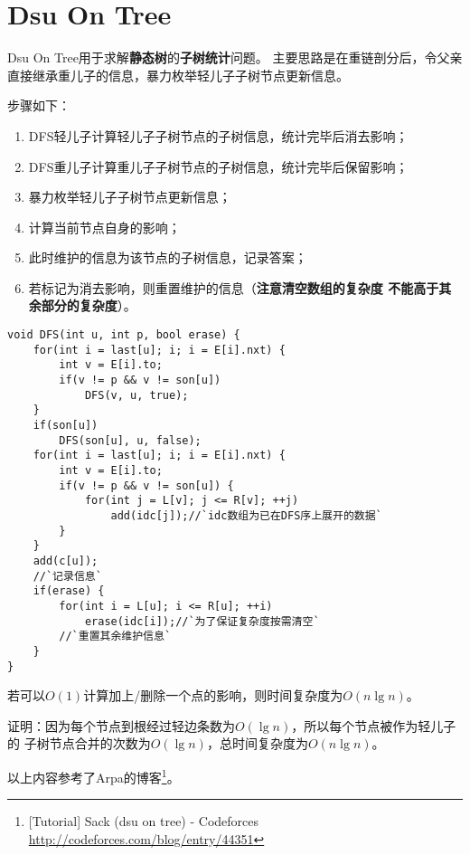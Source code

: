 \section{Dsu On Tree}
Dsu On Tree用于求解{\bfseries 静态树}的{\bfseries 子树统计}问题。
主要思路是在重链剖分后，令父亲直接继承重儿子的信息，暴力枚举轻儿子子树节点更新信息。

步骤如下：
\begin{enumerate}
    \item DFS轻儿子计算轻儿子子树节点的子树信息，统计完毕后消去影响；
    \item DFS重儿子计算重儿子子树节点的子树信息，统计完毕后保留影响；
    \item 暴力枚举轻儿子子树节点更新信息；
    \item 计算当前节点自身的影响；
    \item 此时维护的信息为该节点的子树信息，记录答案；
    \item 若标记为消去影响，则重置维护的信息（{\bfseries 注意清空数组的复杂度
    不能高于其余部分的复杂度}）。
\end{enumerate}

\begin{lstlisting}[title=Dsu On Tree]
void DFS(int u, int p, bool erase) {
    for(int i = last[u]; i; i = E[i].nxt) {
        int v = E[i].to;
        if(v != p && v != son[u])
            DFS(v, u, true);
    }
    if(son[u])
        DFS(son[u], u, false);
    for(int i = last[u]; i; i = E[i].nxt) {
        int v = E[i].to;
        if(v != p && v != son[u]) {
            for(int j = L[v]; j <= R[v]; ++j)
                add(idc[j]);//`idc数组为已在DFS序上展开的数据`
        }
    }
    add(c[u]);
    //`记录信息`
    if(erase) {
        for(int i = L[u]; i <= R[u]; ++i)
            erase(idc[i]);//`为了保证复杂度按需清空`
        //`重置其余维护信息`
    }
}
\end{lstlisting}

若可以$O(1)$计算加上/删除一个点的影响，则时间复杂度为$O(n\lg n)$。

证明：因为每个节点到根经过轻边条数为$O(\lg n)$，所以每个节点被作为轻儿子的
子树节点合并的次数为$O(\lg n)$，总时间复杂度为$O(n\lg n)$。

以上内容参考了Arpa的博客\footnote{[Tutorial] Sack (dsu on tree) - Codeforces
    \url{http://codeforces.com/blog/entry/44351}
}。
